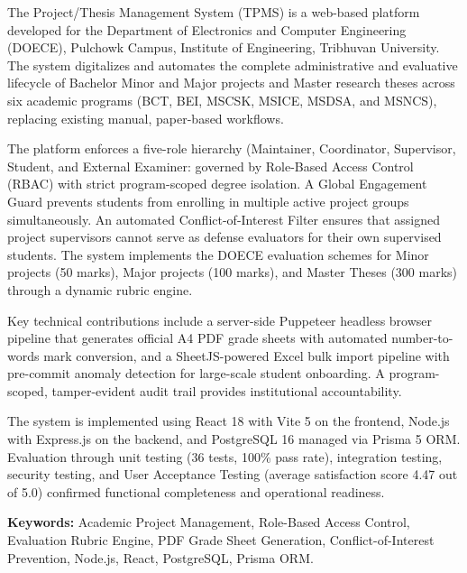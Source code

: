 The Project/Thesis Management System (TPMS) is a web-based platform developed for the Department of Electronics and Computer Engineering (DOECE), Pulchowk Campus, Institute of Engineering, Tribhuvan University. The system digitalizes and automates the complete administrative and evaluative lifecycle of Bachelor Minor and Major projects and Master research theses across six academic programs (BCT, BEI, MSCSK, MSICE, MSDSA, and MSNCS), replacing existing manual, paper-based workflows.

The platform enforces a five-role hierarchy (Maintainer, Coordinator, Supervisor, Student, and External Examiner: governed by Role-Based Access Control (RBAC) with strict program-scoped degree isolation. A Global Engagement Guard prevents students from enrolling in multiple active project groups simultaneously. An automated Conflict-of-Interest Filter ensures that assigned project supervisors cannot serve as defense evaluators for their own supervised students. The system implements the DOECE evaluation schemes for Minor projects (50 marks), Major projects (100 marks), and Master Theses (300 marks) through a dynamic rubric engine.

Key technical contributions include a server-side Puppeteer headless browser pipeline that generates official A4 PDF grade sheets with automated number-to-words mark conversion, and a SheetJS-powered Excel bulk import pipeline with pre-commit anomaly detection for large-scale student onboarding. A program-scoped, tamper-evident audit trail provides institutional accountability.

The system is implemented using React 18 with Vite 5 on the frontend, Node.js with Express.js on the backend, and PostgreSQL 16 managed via Prisma 5 ORM. Evaluation through unit testing (36 tests, 100\% pass rate), integration testing, security testing, and User Acceptance Testing (average satisfaction score 4.47 out of 5.0) confirmed functional completeness and operational readiness.

\textbf{Keywords:} Academic Project Management, Role-Based Access Control, Evaluation Rubric Engine, PDF Grade Sheet Generation, Conflict-of-Interest Prevention, Node.js, React, PostgreSQL, Prisma ORM.
